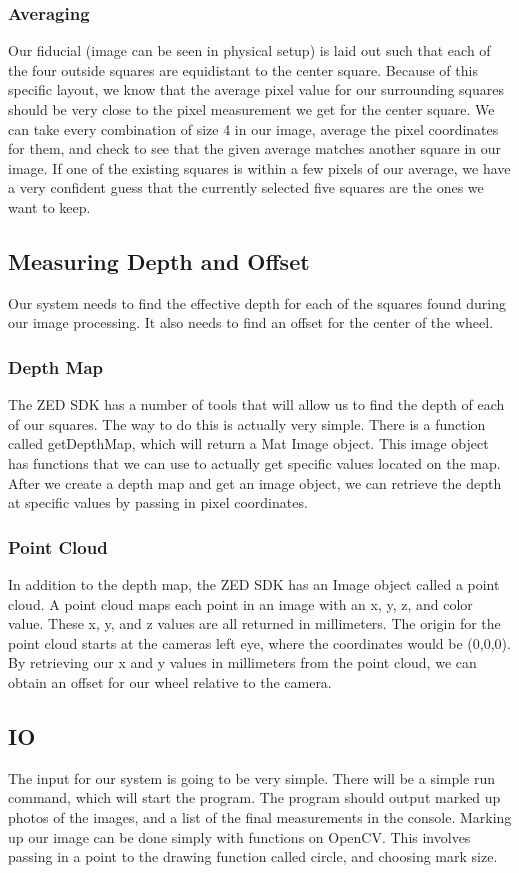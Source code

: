 \documentclass[onecolumn, draftclsnofoot,10pt, compsoc]{IEEEtran}
\begin{document}
\subsubsection{Averaging}
Our fiducial (image can be seen in physical setup) is laid out such that each of the four outside squares are equidistant to the center square.  Because of this specific layout, we know that the average pixel value for our surrounding squares should be very close to the pixel measurement we get for the center square.  We can take every combination of size 4 in our image, average the pixel coordinates for them, and check to see that the given average matches another square in our image.  If one of the existing squares is within a few pixels of our average, we have a very confident guess that the currently selected five squares are the ones we want to keep.

\subsection{Measuring Depth and Offset}
Our system needs to find the effective depth for each of the squares found during our image processing. It also needs to find an offset for the center of the wheel.

\subsubsection{Depth Map}
The ZED SDK has a number of tools that will allow us to find the depth of each of our squares.  The way to do this is actually very simple.  There is a function called getDepthMap, which will return a Mat Image object.  This image object has functions that we can use to actually get specific values located on the map.  After we create a depth map and get an image object, we can retrieve the depth at specific values by passing in pixel coordinates.

\subsubsection{Point Cloud}
In addition to the depth map, the ZED SDK has an Image object called a point cloud.  A point cloud maps each point in an image with an x, y, z, and color value.  These x, y, and z values are all returned in millimeters.  The origin for the point cloud starts at the cameras left eye, where the coordinates would be (0,0,0).  By retrieving our x and y values in millimeters from the point cloud, we can obtain an offset for our wheel relative to the camera.


\subsection{IO}
The input for our system is going to be very simple.  There will be a simple run command, which will start the program. The program should output marked up photos of the images, and a list of the final measurements in the console.  Marking up our image can be done simply with functions on OpenCV.  This involves passing in a point to the drawing function called circle, and choosing mark size.
\end{document}
